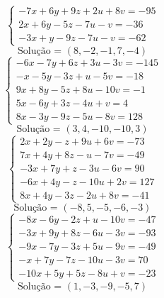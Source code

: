 \documentclass[12pt,oneside,a4paper,fleqn]{article}
\begin{document}
\begin{multicols*}{2}
\begin{equation*}
\begin{cases}
-7x+6y+9z+2u+8v=-95 \\
2x+6y-5z-7u-v=-36 \\
-3x+y-9z-7u-v=-62
\end{cases}
\end{equation*}
\begin{equation*}
\text{Solução = }\left(8,-2,-1,7,-4\right)
\end{equation*}
\vspace{\baselineskip}
\begin{equation*}
\begin{cases}
-6x-7y+6z+3u-3v=-145 \\
-x-5y-3z+u-5v=-18 \\
9x+8y-5z+8u-10v=-1 \\
5x-6y+3z-4u+v=4 \\
8x-3y-9z-5u-8v=128
\end{cases}
\end{equation*}
\begin{equation*}
\text{Solução = }\left(3,4,-10,-10,3\right)
\end{equation*}
\vspace{\baselineskip}
\begin{equation*}
\begin{cases}
2x+2y-z+9u+6v=-73 \\
7x+4y+8z-u-7v=-49 \\
-3x+7y+z-3u-6v=90 \\
-6x+4y-z-10u+2v=127 \\
8x+4y-3z-2u+8v=-41
\end{cases}
\end{equation*}
\begin{equation*}
\text{Solução = }\left(-8,5,-5,-6,-3\right)
\end{equation*}
\vspace{\baselineskip}
\begin{equation*}
\begin{cases}
-8x-6y-2z+u-10v=-47 \\
-3x+9y+8z-6u-3v=-93 \\
-9x-7y-3z+5u-9v=-49 \\
-x+7y-7z-10u-3v=70 \\
-10x+5y+5z-8u+v=-23
\end{cases}
\end{equation*}
\begin{equation*}
\text{Solução = }\left(1,-3,-9,-5,7\right)
\end{equation*}
\vspace{\baselineskip}
\begin{equation*}

\end{equation*}
\end{multicols*}
\end{document}
